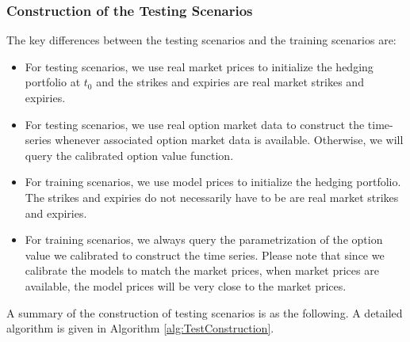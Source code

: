\subsubsection{Construction of the Testing Scenarios}
\label{sec:AugTest}
The key differences between the testing scenarios and the training scenarios are:
\begin{itemize}
	\item  For testing scenarios, we use real market prices to initialize the hedging portfolio at $t_0$ and the strikes and expiries are real market strikes and expiries.
	\item  For testing scenarios, we use real option market data to construct the time-series whenever associated  option market data is available. Otherwise, we will query the calibrated option value function.
	\item For training scenarios, we use model prices to initialize the hedging portfolio. The strikes and expiries do not necessarily have to be are real market strikes and expiries.
	\item   For training scenarios, we always query the parametrization of the option value we calibrated to construct  the time series. Please note that  since we calibrate the models to match the market prices, when market prices are available, the model prices will be very close to the market prices. 
\end{itemize}
A summary of the construction of testing scenarios is as the following. A detailed algorithm is given in Algorithm \ref{alg:TestConstruction}.

